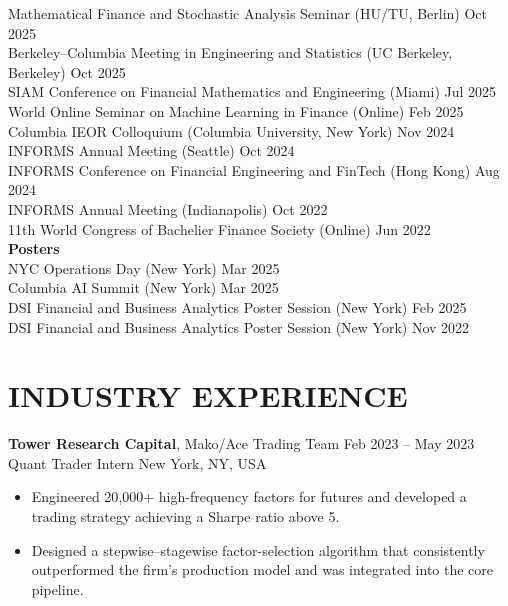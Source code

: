 \documentclass[margin, 10pt]{res} %
\begin{document}
\begin{resume}
Mathematical Finance and Stochastic Analysis Seminar (HU/TU, Berlin) \hfill Oct 2025\\
Berkeley–Columbia Meeting in Engineering and Statistics (UC Berkeley, Berkeley) \hfill Oct 2025\\
SIAM Conference on Financial Mathematics and Engineering (Miami) \hfill Jul 2025\\
World Online Seminar on Machine Learning in Finance (Online) \hfill Feb 2025\\
Columbia IEOR Colloquium (Columbia University, New York) \hfill Nov 2024\\
INFORMS Annual Meeting (Seattle) \hfill Oct 2024\\
INFORMS Conference on Financial Engineering and FinTech \newline
\hspace*{1em}(Hong Kong) \hfill Aug 2024\\
INFORMS Annual Meeting (Indianapolis) \hfill Oct 2022\\
11th World Congress of Bachelier Finance Society (Online) \hfill Jun 2022\\


\textbf{Posters}\\
NYC Operations Day (New York) \hfill Mar 2025\\
Columbia AI Summit (New York) \hfill Mar 2025\\
DSI Financial and Business Analytics Poster Session (New York) \hfill Feb 2025\\
DSI Financial and Business Analytics Poster Session (New York) \hfill Nov 2022\\





\section{INDUSTRY EXPERIENCE}

\textbf{Tower Research Capital}, Mako/Ace Trading Team \hfill Feb 2023 – May 2023\\
Quant Trader Intern \hfill New York, NY, USA
\begin{itemize}
    \item Engineered 20{,}000+ high-frequency factors for futures and developed a trading strategy achieving a Sharpe ratio above 5.
    \item Designed a stepwise–stagewise factor-selection algorithm that consistently outperformed the firm’s production model and was integrated into the core pipeline.
\end{itemize}


\end{resume}
\end{document}
